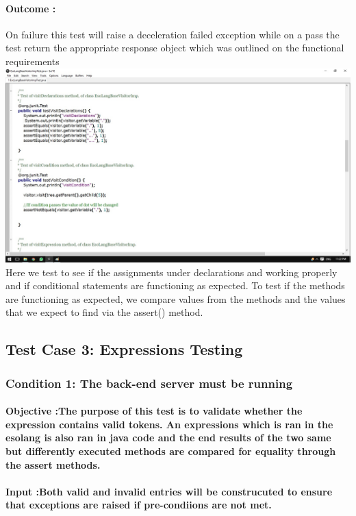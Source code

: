 \documentclass[english]{article}
\begin{document}
			\paragraph{Outcome :} On failure this test will raise a deceleration failed exception while on a pass the test return the  appropriate response object  which was outlined on the functional requirements  \\
			\includegraphics[width=\linewidth]{test2.jpg}
			\\[12pt]	
			Here we test to see if the assignments under declarations and working properly and if conditional statements are functioning as expected.
			To test if the methods are functioning as expected, we compare values from the methods and the values that	we expect to find via the assert() method.	
			\subsection{Test Case 3: Expressions Testing}
			\subsubsection{Condition 1: The back-end server must be running}
			\paragraph{Objective :The purpose of this test is to validate whether the expression contains valid tokens. An expressions which is ran in the esolang is also ran in java code and the end results of the two same but differently executed methods are compared for equality through the assert methods.}
			\paragraph{Input :Both valid and invalid entries will be construcuted to ensure that exceptions are raised if pre-condiions are not met.}
\end{document}
